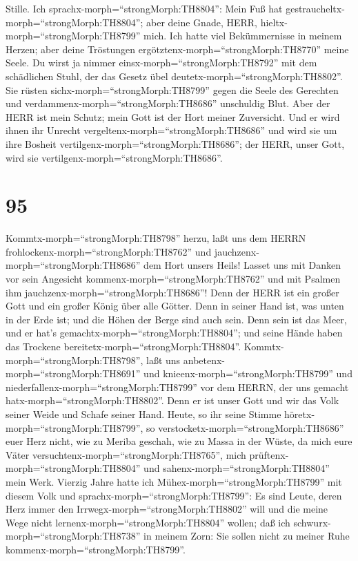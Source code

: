 Stille.  Ich sprachx-morph=``strongMorph:TH8804'': Mein Fuß
hat gestraucheltx-morph=``strongMorph:TH8804''; aber deine Gnade, HERR,
hieltx-morph=``strongMorph:TH8799'' mich.  Ich hatte viel
Bekümmernisse in meinem Herzen; aber deine Tröstungen
ergötztenx-morph=``strongMorph:TH8770'' meine Seele.  Du
wirst ja nimmer einsx-morph=``strongMorph:TH8792'' mit dem schädlichen
Stuhl, der das Gesetz übel deutetx-morph=``strongMorph:TH8802''.
 Sie rüsten sichx-morph=``strongMorph:TH8799'' gegen die
Seele des Gerechten und verdammenx-morph=``strongMorph:TH8686''
unschuldig Blut.  Aber der HERR ist mein Schutz; mein Gott
ist der Hort meiner Zuversicht.  Und er wird ihnen ihr
Unrecht vergeltenx-morph=``strongMorph:TH8686'' und wird sie um ihre
Bosheit vertilgenx-morph=``strongMorph:TH8686''; der HERR, unser Gott,
wird sie vertilgenx-morph=``strongMorph:TH8686''.

\hypertarget{section-94}{%
\section{95}\label{section-94}}

 Kommtx-morph=``strongMorph:TH8798'' herzu, laßt uns dem
HERRN frohlockenx-morph=``strongMorph:TH8762'' und
jauchzenx-morph=``strongMorph:TH8686'' dem Hort unsers Heils!
 Lasset uns mit Danken vor sein Angesicht
kommenx-morph=``strongMorph:TH8762'' und mit Psalmen ihm
jauchzenx-morph=``strongMorph:TH8686''!  Denn der HERR ist
ein großer Gott und ein großer König über alle Götter.  Denn
in seiner Hand ist, was unten in der Erde ist; und die Höhen der Berge
sind auch sein.  Denn sein ist das Meer, und er hat's
gemachtx-morph=``strongMorph:TH8804''; und seine Hände haben das
Trockene bereitetx-morph=``strongMorph:TH8804''. 
Kommtx-morph=``strongMorph:TH8798'', laßt uns
anbetenx-morph=``strongMorph:TH8691'' und
knieenx-morph=``strongMorph:TH8799'' und
niederfallenx-morph=``strongMorph:TH8799'' vor dem HERRN, der uns
gemacht hatx-morph=``strongMorph:TH8802''.  Denn er ist
unser Gott und wir das Volk seiner Weide und Schafe seiner Hand. Heute,
so ihr seine Stimme höretx-morph=``strongMorph:TH8799'',  so
verstocketx-morph=``strongMorph:TH8686'' euer Herz nicht, wie zu Meriba
geschah, wie zu Massa in der Wüste,  da mich eure Väter
versuchtenx-morph=``strongMorph:TH8765'', mich
prüftenx-morph=``strongMorph:TH8804'' und
sahenx-morph=``strongMorph:TH8804'' mein Werk.  Vierzig
Jahre hatte ich Mühex-morph=``strongMorph:TH8799'' mit diesem Volk und
sprachx-morph=``strongMorph:TH8799'': Es sind Leute, deren Herz immer
den Irrwegx-morph=``strongMorph:TH8802'' will und die meine Wege nicht
lernenx-morph=``strongMorph:TH8804'' wollen;  daß ich
schwurx-morph=``strongMorph:TH8738'' in meinem Zorn: Sie sollen nicht zu
meiner Ruhe kommenx-morph=``strongMorph:TH8799''.

